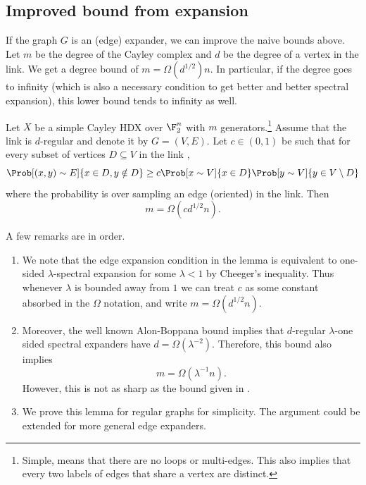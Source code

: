 \subsection{Improved bound from expansion}
If the graph \(G\) is an (edge) expander, we can improve the naive bounds above. Let \(m\) be the degree of the Cayley complex and \(d\) be the degree of a vertex in the link. We get a degree bound of \(m = \Omega(d^{1/2})n\). In particular, if the degree goes to infinity (which is also a necessary condition to get better and better spectral expansion), this lower bound tends to infinity as well. %

\begin{lemma} \label{lem:deg-strong-lower-bound}
    Let \(X\) be a simple Cayley HDX over \(\F_2^n\) with \(m\) generators.\footnote{Simple, means that there are no loops or multi-edges. This also implies that every two labels of edges that share a vertex are distinct.} Assume that the link is \(d\)-regular and denote it by \(G=(V,E)\). Let \(c \in (0,1)\) be such that for every subset of vertices \(D \subseteq V\) in the link ,
    \[\Prob[(x,y)\sim E]{x\in D, y \notin D} \geq c\Prob[x\sim V]{x\in D} \Prob[y\sim V]{y\in V \setminus D}\]
    where the probability is over sampling an edge (oriented) in the link. Then
    \[m = \Omega(c d^{1/2} n).\]
\end{lemma}
A few remarks are in order.
\begin{remark}
    \begin{enumerate}
        \item We note that the edge expansion condition in the lemma is equivalent to one-sided $\lambda$-spectral expansion for some \(\lambda < 1\) by Cheeger's inequality. Thus whenever \(\lambda\) is bounded away from \(1\) we can treat \(c\) as some constant absorbed in the \(\Omega\) notation, and write \(m=\Omega(d^{1/2} n)\).
        \item Moreover, the well known Alon-Boppana bound implies that \(d\)-regular \(\lambda\)-one sided spectral expanders have \(d = \Omega(\lambda^{-2})\). Therefore, this bound also implies
        \[m = \Omega(\lambda^{-1} n).\]
        However, this is not as sharp as the bound given in \cite{alon1992simple}.
        \item We prove this lemma for regular graphs for simplicity. The argument could be extended for more general edge expanders.
    \end{enumerate}
\end{remark}

